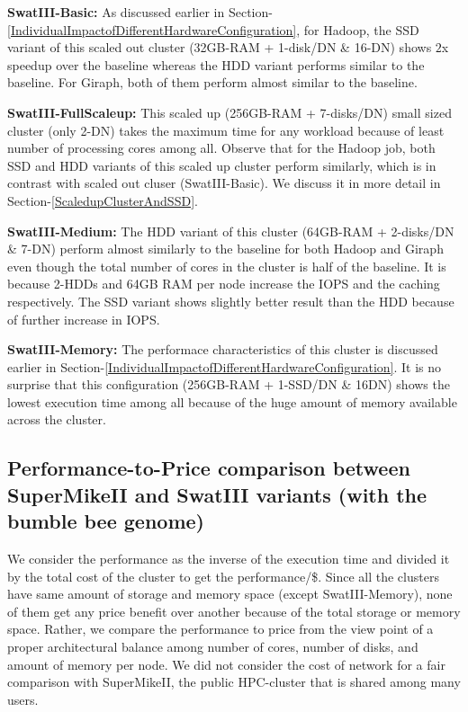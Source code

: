 \documentclass[conference]{IEEEtran}
\begin{document}
\begin{inparaenum}[\itshape 1\upshape)]
\item \textbf{SwatIII-Basic:} As discussed earlier in Section-\ref{IndividualImpactofDifferentHardwareConfiguration}, for Hadoop, the SSD variant of this scaled out cluster (32GB-RAM + 1-disk/DN \& 16-DN) shows $2$x speedup over the baseline whereas the HDD variant performs similar to the baseline. For Giraph, both of them perform almost similar to the baseline.
\item \textbf{SwatIII-FullScaleup:} This scaled up (256GB-RAM + 7-disks/DN) small sized cluster (only 2-DN) takes the maximum time for any workload because of least number of processing cores among all. Observe that for the Hadoop job, both SSD and HDD variants of this scaled up cluster perform similarly, which is in contrast with scaled out cluser (SwatIII-Basic). We discuss it in more detail in Section-\ref{ScaledupClusterAndSSD}.
\item \textbf{SwatIII-Medium:} The HDD variant of this cluster (64GB-RAM + 2-disks/DN \& 7-DN) perform almost similarly to the baseline for both Hadoop and Giraph even though the total number of cores in the cluster is half of the baseline. It is because 2-HDDs and 64GB RAM per node increase the IOPS and the caching respectively. The SSD variant shows slightly better result than the HDD because of further increase in IOPS.
\item \textbf{SwatIII-Memory:} The performace characteristics of this cluster is discussed earlier in Section-\ref{IndividualImpactofDifferentHardwareConfiguration}. 
It is no surprise that this configuration (256GB-RAM + 1-SSD/DN \& 16DN) shows the lowest execution time among all because of the huge amount of memory available across the cluster.
\end{inparaenum}

\subsection {Performance-to-Price comparison between SuperMikeII and SwatIII variants (with the bumble bee genome)} \label{PriceToPerformanceBumbleBee}
We consider the performance as the inverse of the execution time and divided it by the total cost of the cluster to get the performance/\$. Since all the clusters have same amount of storage and memory space (except SwatIII-Memory), none of them get any price benefit over another because of the total storage or memory space. Rather, we compare the performance to price from the view point of a proper architectural balance among number of cores, number of disks, and amount of memory per node. We did not consider the cost of network for a fair comparison with SuperMikeII, the public HPC-cluster that is shared among many users.
\end{document}
